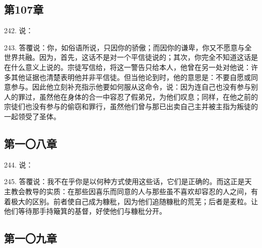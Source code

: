 
\subsection{第107章}

242. 说：\par

243. 答覆说：你，如俗语所说，只因你的骄傲；而因你的谦卑，你又不愿意与全世界共融。因为，首先，这话不是对一个平信徒说的；其次，你完全不知道这话是在什么意义上说的。宗徒写信给，将这一警告只给本人，他曾在另一处对他说：许多其他证据也清楚表明他并非平信徒。但当他论到时，他的意思是：不要自愿或同意参与。因此他立刻补充指示他要如何服从这命令，说：因为连自己也没有参与别人的罪过，虽然他在身体的合一中容忍了假弟兄，为他们叹息；同样，在他之前的宗徒们也没有参与的偷窃和罪行，虽然他们曾与那已出卖自己主并被主指为叛徒的一起领受了圣体。\par


\subsection{第一〇八章}

244. 说：\par

245. 答覆说：我不在乎你是以何种方式使用这些话，它们是正确的。而这正是天主教会教导的实质：在那些因喜乐而同意的人与那些虽不喜欢却容忍的人之间，有着极大的区别。前者使自己成为糠秕，因为他们追随糠秕的荒芜；后者是麦粒。让他们等待那手持簸箕的基督，好使他们与糠秕分开。\par


\subsection{第一〇九章}


